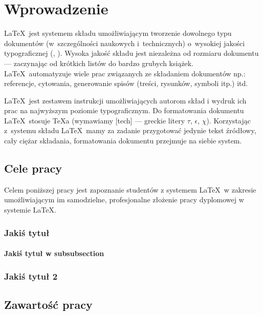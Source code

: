 \chapter{Wprowadzenie}\label{cha:wprowadzenie}

\LaTeX~jest systemem składu umożliwiającym tworzenie dowolnego typu dokumentów (w~szczególności naukowych i~technicznych) o~wysokiej jakości typograficznej (\cite{Dil00}, \cite{Lam92}). Wysoka jakość składu jest niezależna od rozmiaru dokumentu --- zaczynając od krótkich listów do bardzo grubych książek. \LaTeX~automatyzuje wiele prac związanych ze składaniem dokumentów np.: referencje, cytowania, generowanie spisów (treści, rysunków, symboli itp.) itd.

\LaTeX~jest zestawem instrukcji umożliwiających autorom skład i wydruk ich prac na najwyższym poziomie typograficznym. Do formatowania dokumentu \LaTeX~stosuje \TeX{}a (wymawiamy [tech] --- greckie litery $\tau$, $\epsilon$, $\chi$). Korzystając z~systemu składu \LaTeX~mamy za zadanie przygotować jedynie tekst źródłowy, cały ciężar składania, formatowania dokumentu przejmuje na siebie system.


\section{Cele pracy}\label{sec:celePracy}


Celem poniższej pracy jest zapoznanie studentów z systemem \LaTeX~w zakresie umożliwiającym im samodzielne, profesjonalne złożenie pracy dyplomowej w systemie \LaTeX.

\subsection{Jakiś tytuł}

\subsubsection{Jakiś tytuł w subsubsection}


\subsection{Jakiś tytuł 2}


\section{Zawartość pracy}\label{sec:zawartoscPracy}

